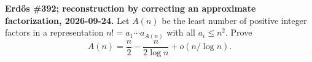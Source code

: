 \textbf{Erd\H{o}s \#392; reconstruction by correcting an approximate factorization, 2026-09-24.}
Let $A(n)$ be the least number of positive integer factors in a representation $n!=a_1\cdots a_{A(n)}$ with all $a_i\leq n^2$. Prove
\[
A(n)=\frac n2-\frac{n}{2\log n}+o(n/\log n).
\]
